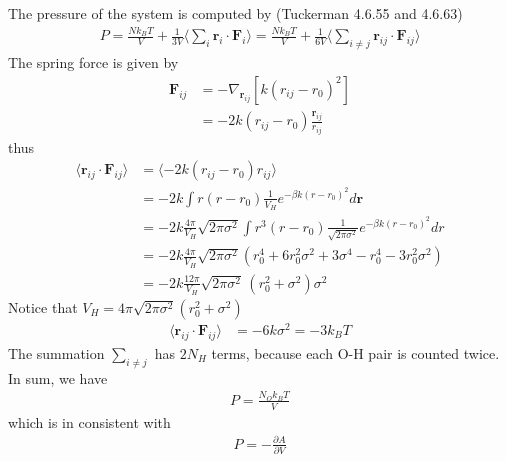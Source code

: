 \documentclass[aps,pre,a4paper,showkeys,fleqn]{revtex4}
\begin{document}
The pressure of the system is computed by (Tuckerman 4.6.55 and 4.6.63)
\begin{align*}
  P
  = \frac{Nk_BT}{V} +
  \frac{1}{3V}
  \Big\langle
  \sum_i \bm r_i\cdot\bm F_i  
  \Big\rangle
  = \frac{Nk_BT}{V} +
  \frac{1}{6V}
  \Big\langle
  \sum_{i\neq j} \bm r_{ij}\cdot\bm F_{ij}
  \Big\rangle
\end{align*}
The spring force is given by
\begin{align*}
  \bm F_{ij}
  &=
    -\nabla_{\bm r_{ij}} [k (r_{ij} - r_0)^2] \\
  &=
    -2k(r_{ij} - r_0) \frac{\bm r_{ij}}{r_{ij}}
\end{align*}
thus
\begin{align*}
  \langle \bm r_{ij}\cdot\bm F_{ij} \rangle
  &=
    \langle -2k(r_{ij} - r_0)r_{ij} \rangle \\
  &=
    -2k \int r(r - r_0) \frac{1}{V_H} e^{-\beta k(r - r_0)^2} d\bm r \\
  &=
    -2k \frac{4\pi}{V_H} \sqrt{2\pi\sigma^2} \int r^3(r - r_0)\frac{1}{\sqrt{2\pi\sigma^2}} e^{-\beta k(r - r_0)^2} dr\\
  &=
    -2k \frac{4\pi}{V_H} \sqrt{2\pi\sigma^2} (r_0^4 + 6 r_0^2\sigma^2 + 3 \sigma^4 - r_0^4 - 3r_0^2\sigma^2 )\\
  &=
    -2k \frac{12\pi}{V_H} \sqrt{2\pi\sigma^2} \, ( r_0^2 + \sigma^2)\sigma^2
\end{align*}
Notice that $V_H = 4\pi\sqrt{2\pi\sigma^2} (r_0^2 + \sigma^2)$
\begin{align*}
  \langle \bm r_{ij}\cdot\bm F_{ij} \rangle
  &= -6k \sigma^2 = -3 k_BT
\end{align*}
The summation $\sum_{i\neq j}$ has $2N_H$ terms, because each O-H pair is counted twice.
In sum, we have
\begin{align*}
  P = \frac{N_O k_BT}{V}
\end{align*}
which is in consistent with
\begin{align*}
  P = -\frac{\partial A}{\partial V}
\end{align*}

{}

\end{document}
